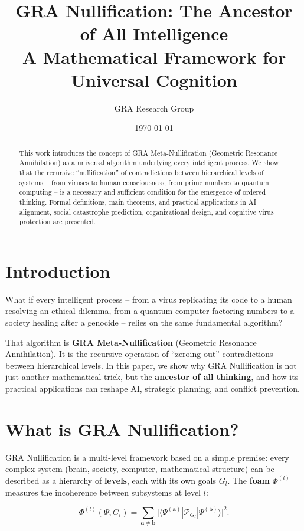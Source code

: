 \documentclass[12pt]{article}
\title{GRA Nullification: The Ancestor of All Intelligence \\
\large{A Mathematical Framework for Universal Cognition}}
\author{GRA Research Group}
\date{\today}
\begin{document}
\maketitle

\begin{abstract}
This work introduces the concept of GRA Meta-Nullification (Geometric Resonance Annihilation) as a universal algorithm underlying every intelligent process. We show that the recursive ``nullification'' of contradictions between hierarchical levels of systems – from viruses to human consciousness, from prime numbers to quantum computing – is a necessary and sufficient condition for the emergence of ordered thinking. Formal definitions, main theorems, and practical applications in AI alignment, social catastrophe prediction, organizational design, and cognitive virus protection are presented.
\end{abstract}

\section{Introduction}

What if every intelligent process – from a virus replicating its code to a human resolving an ethical dilemma, from a quantum computer factoring numbers to a society healing after a genocide – relies on the same fundamental algorithm?

That algorithm is \textbf{GRA Meta-Nullification} (Geometric Resonance Annihilation). It is the recursive operation of ``zeroing out'' contradictions between hierarchical levels. In this paper, we show why GRA Nullification is not just another mathematical trick, but the \textbf{ancestor of all thinking}, and how its practical applications can reshape AI, strategic planning, and conflict prevention.

\section{What is GRA Nullification?}

GRA Nullification is a multi-level framework based on a simple premise: every complex system (brain, society, computer, mathematical structure) can be described as a hierarchy of \textbf{levels}, each with its own goals \( G_l \). The \textbf{foam} \( \Phi^{(l)} \) measures the incoherence between subsystems at level \( l \):

\[
\Phi^{(l)}(\Psi, G_l) = \sum_{\mathbf{a}\neq\mathbf{b}} \bigl| \langle \Psi^{(\mathbf{a})} | \mathcal{P}_{G_l} | \Psi^{(\mathbf{b})} \rangle \bigr|^2 .
\]
\end{document}
